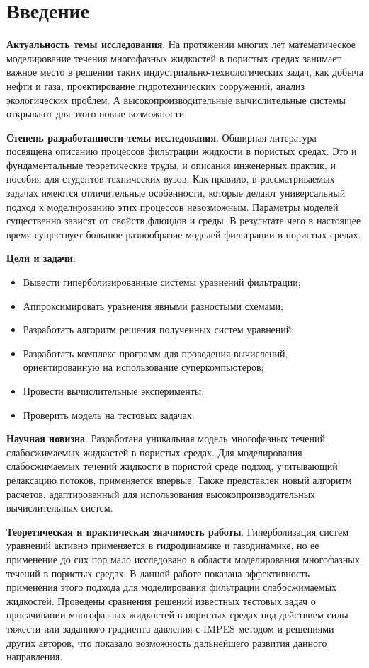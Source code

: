 \chapter*{Введение}                         %
\textbf{Актуальность темы исследования}. На протяжении многих лет математическое моделирование течения многофазных жидкостей в пористых средах занимает важное место в решении таких индустриально-технологических задач, как добыча нефти и газа, проектирование гидротехнических сооружений, анализ экологических проблем. 
А высокопроизводительные вычислительные системы открывают для этого новые возможности.

\textbf{Степень разработанности темы исследования}. Обширная литература посвящена описанию процессов фильтрации
жидкости в пористых средах. Это и фундаментальные теоретические труды, и описания инженерных практик, и пособия для студентов технических вузов. Как правило, в рассматриваемых задачах имеются отличительные особенности,
которые делают универсальный подход к моделированию этих процессов невозможным.
Параметры моделей существенно зависят от свойств флюидов и среды.
В результате чего в настоящее время существует большое разнообразие моделей фильтрации в пористых средах.

\textbf{Цели и задачи}:
\begin{itemize}
 \item Вывести гиперболизированные системы уравнений фильтрации;
 \item Аппроксимировать уравнения явными разностыми схемами;
 \item Разработать алгоритм решения полученных систем уравнений;
 \item Разработать комплекс программ для проведения вычислений, ориентированную на использование суперкомпьютеров;
 \item Провести вычислительные эксперименты;
 \item Проверить модель на тестовых задачах.
\end{itemize}

\textbf{Научная новизна}. Разработана уникальная модель многофазных течений слабосжимаемых жидкостей в пористых средах.
Для моделирования слабосжимаемых течений жидкости в пористой среде подход, учитывающий релаксацию потоков, применяется впервые.
Также представлен новый алгоритм расчетов, адаптированный для использования высокопроизводительных вычислительных систем.

\textbf{Теоретическая и практическая значимость работы}. Гиперболизация систем уравнений активно применяется в гидродинамике и газодинамике, но ее применение  до сих пор мало исследовано в области моделирования многофазных течений в пористых средах. В данной работе показана эффективность применения этого подхода для моделирования фильтрации слабосжимаемых жидкостей. Проведены сравнения решений известных тестовых задач о просачивании многофазных жидкостей в пористых средах под действием силы тяжести или заданного градиента давления с IMPES-методом и решениями других авторов, что показало возможность дальнейшего развития данного направления.

